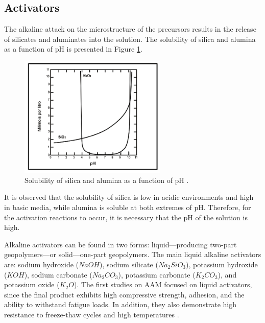 

\subsection{Activators}

The alkaline attack on the microstructure of the precursors results in the release of silicates and aluminates into the solution.
The solubility of silica and alumina as a function of pH is presented in Figure \ref{fig:solubility}.

\begin{figure}[ht]
  \centering
  \includegraphics[width=0.625\textwidth]{Cap2/images/solubility.png}
  \caption{Solubility of silica and alumina as a function of pH \cite{mason1952principles}.}
  \label{fig:solubility}
\end{figure}

It is observed that the solubility of silica is low in acidic environments and high in basic media, while alumina is soluble at both extremes of pH.
Therefore, for the activation reactions to occur, it is necessary that the pH of the solution is high.

Alkaline activators can be found in two forms: liquid—producing two-part geopolymers—or solid—one-part geopolymers.
The main liquid alkaline activators are: sodium hydroxide ($NaOH$), sodium silicate ($Na_2SiO_3$), potassium hydroxide ($KOH$), sodium carbonate ($Na_2CO_3$), potassium carbonate ($K_2CO_3$), and potassium oxide ($K_2O$).
The first studies on AAM focused on liquid activators, since the final product exhibits high compressive strength, adhesion, and the ability to withstand fatigue loads. In addition, they also demonstrate high resistance to freeze-thaw cycles and high temperatures \cite{heath2014gwp}.

